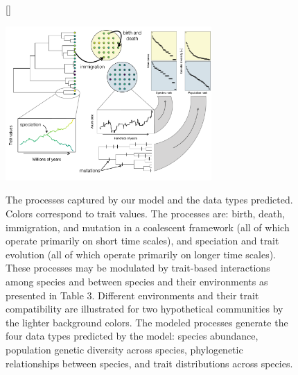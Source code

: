 \documentclass[11pt]{article}
\begin{document}
\begin{figure}[htb]
[\FBwidth]
{\caption{The processes captured by our model and the data types
predicted. Colors correspond to trait values. The processes are: birth,
death, immigration, and mutation in a coalescent framework (all of which
operate primarily on short time scales), and speciation and trait
evolution (all of which operate primarily on longer time scales). These
processes may be modulated by trait-based interactions among species and
between species and their environments as presented in Table 3.
Different environments and their trait compatibility are illustrated for
two hypothetical communities by the lighter background colors. The
modeled processes generate the four data types predicted by the model:
species abundance, population genetic diversity across species,
phylogenetic relationships between species, and trait distributions
across species.}\label{fig:mod}}
{\includegraphics[width=0.7\textwidth]{../fig_mod.pdf}}
\end{figure}

\end{document}
